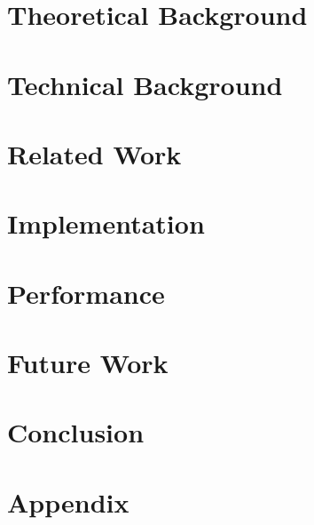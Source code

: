 \documentclass[headsepline,footsepline,footinclude=false,oneside,fontsize=11pt,paper=a4,listof=totoc,bibliography=totoc]{scrbook} %
\begin{document}


\frontmatter{}





\tableofcontents{}

\mainmatter{}




\chapter{Theoretical Background}


\chapter{Technical Background}


\chapter{Related Work}



\chapter{Implementation}


\chapter{Performance}


\chapter{Future Work}


\chapter{Conclusion}



\appendix
\chapter{Appendix} \label{sec:appendix}

\appendix{}




\listoffigures{}
\listoftables{}
\printbibliography{}
\end{document}
